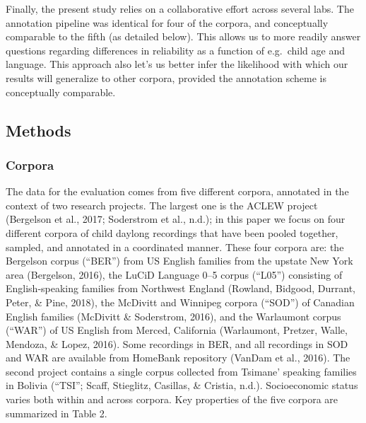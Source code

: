 \documentclass[english,table,man,floatsintext]{apa6}
\begin{document}
Finally, the present study relies on a collaborative effort across several labs. The annotation pipeline was identical for four of the corpora, and conceptually comparable to the fifth (as detailed below). This allows us to more readily answer questions regarding differences in reliability as a function of e.g.~child age and language. This approach also let's us better infer the likelihood with which our results will generalize to other corpora, provided the annotation scheme is conceptually comparable.

\hypertarget{methods}{%
\subsection{Methods}\label{methods}}

\hypertarget{corpora}{%
\subsubsection{Corpora}\label{corpora}}

The data for the evaluation comes from five different corpora, annotated in the context of two research projects. The largest one is the ACLEW project (Bergelson et al., 2017; Soderstrom et al., n.d.); in this paper we focus on four different corpora of child daylong recordings that have been pooled together, sampled, and annotated in a coordinated manner. These four corpora are: the Bergelson corpus (\enquote{BER}) from US English families from the upstate New York area (Bergelson, 2016), the LuCiD Language 0--5 corpus (\enquote{L05}) consisting of English-speaking families from Northwest England (Rowland, Bidgood, Durrant, Peter, \& Pine, 2018), the McDivitt and Winnipeg corpora (\enquote{SOD}) of Canadian English families (McDivitt \& Soderstrom, 2016), and the Warlaumont corpus (\enquote{WAR}) of US English from Merced, California (Warlaumont, Pretzer, Walle, Mendoza, \& Lopez, 2016). Some recordings in BER, and all recordings in SOD and WAR are available from HomeBank repository (VanDam et al., 2016). The second project contains a single corpus collected from Tsimane' speaking families in Bolivia (``TSI''; Scaff, Stieglitz, Casillas, \& Cristia, n.d.). Socioeconomic status varies both within and across corpora. Key properties of the five corpora are summarized in Table 2.
\end{document}

